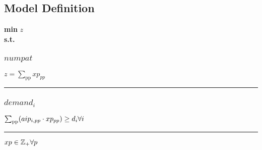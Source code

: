 \documentclass[11pt]{article}
\begin{document}
\subsection*{Model Definition}
\textbf{min} $z$\\
\textbf{s.t.}
\subsubsection*{$numpat$}
$
z = \sum_\text{pp} xp_{pp}
$
\vspace{5pt}
\hrule
\subsubsection*{$demand_{i}$}
$
\sum_\text{pp} (aip_{i,pp} \cdot xp_{pp}) \geq d_{i}\hfill \forall i
$
\vspace{5pt}
\hrule
\bigskip
$xp\in \mathbb{Z}_{+} \forall p\\$
\end{document}
